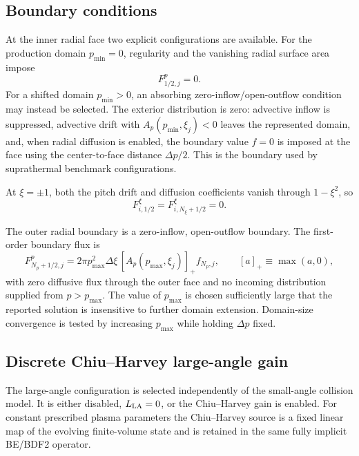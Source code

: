 \documentclass[11pt]{article}
\begin{document}
\subsection{Boundary conditions}

At the inner radial face two explicit configurations are available.  For the production
domain $p_{\min}=0$, regularity and the vanishing radial surface area impose
\begin{equation}
 F^p_{1/2,j}=0.
 \label{eq:inner_zero_flux}
\end{equation}
For a shifted domain $p_{\min}>0$, an absorbing zero-inflow/open-outflow condition may
instead be selected.  The exterior distribution is zero: advective inflow is suppressed,
advective drift with $A_p(p_{\min},\xi_j)<0$ leaves the represented domain, and, when
radial diffusion is enabled, the boundary value $f=0$ is imposed at the face using the
center-to-face distance $\Delta p/2$.  This is the boundary used by suprathermal
benchmark configurations.

At $\xi=\pm1$, both the pitch drift and diffusion coefficients vanish through
$1-\xi^2$, so
\begin{equation}
 F^\xi_{i,1/2}=F^\xi_{i,N_\xi+1/2}=0.
 \label{eq:pitch_boundary_flux}
\end{equation}

The outer radial boundary is a zero-inflow, open-outflow boundary.  The first-order
boundary flux is
\begin{equation}
 F^p_{N_p+1/2,j}
 =2\pi p_{\max}^2\Delta\xi\,
  \left[A_p(p_{\max},\xi_j)\right]_+ f_{N_p,j},
 \qquad [a]_+\equiv\max(a,0),
 \label{eq:outer_flux}
\end{equation}
with zero diffusive flux through the outer face and no incoming distribution supplied
from $p>p_{\max}$.  The value of $p_{\max}$ is chosen sufficiently large that the
reported solution is insensitive to further domain extension.  Domain-size convergence
is tested by increasing $p_{\max}$ while holding $\Delta p$ fixed.

\subsection{Discrete Chiu--Harvey large-angle gain}

The large-angle configuration is selected independently of the small-angle collision
model.  It is either disabled, $L_{\rm LA}=0$, or the Chiu--Harvey gain is enabled.  For
constant prescribed plasma parameters the Chiu--Harvey source is a fixed linear map of
the evolving finite-volume state and is retained in the same fully implicit BE/BDF2
operator.
\end{document}
